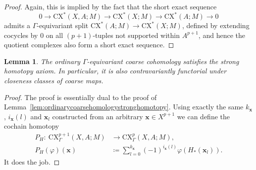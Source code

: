 \documentclass[pdftex]{sigma}
\numberwithin{equation}{section}
\newtheorem{lem}[thm]{Lemma}
\theoremstyle{definition}
\newcommand{\CX}{\mathrm{CX}}
\begin{document}
\begin{proof}
Again, this is implied by the fact that the short exact sequence
\[
0\to\CX^*(X,A;M)\to\CX^*(X;M)\to\CX^*(A;M)\to 0
\]
admits a $\Gamma$-equivariant split $\CX^*(A;M)\to \CX^*(X;M)$, defined by extending cocycles by $0$ on all $(p+1)$-tuples not supported within $A^{p+1}$, and hence the quotient complexes also form a short exact sequence.
\end{proof}

\begin{lem}\label{lem:ordinarycoarsecohomologystronghomotopy}
The ordinary $\Gamma$-equivariant coarse cohomology satisfies the strong homotopy axiom. In particular, it is also contravariantly functorial under \emph{closeness classes} of coarse maps.
\end{lem}

\begin{proof}
The proof is essentially dual to the proof of Lemma~\ref{lem:ordinarycoarsehomologystronghomotopy}. Using exactly the same $k_{\mathbf{x}}$, $i_\mathbf{x}(l)$ and $\mathbf{x}_l$ constructed from an arbitrary $\mathbf{x}\in X^{p+1}$ we can define the cochain homotopy
\begin{align*}
P_H\colon\ \CX_\Gamma^{p+1}(X,A;M)&\to \CX_\Gamma^p(X,A;M),
\\
P_H(\varphi)(\mathbf{x})&\coloneqq\sum_{l=0}^{k_\mathbf{x}}(-1)^{i_\mathbf{x}(l)} \varphi(H_*(\mathbf{x}_l)).
\end{align*}
It does the job.
\end{proof}
\end{document}
